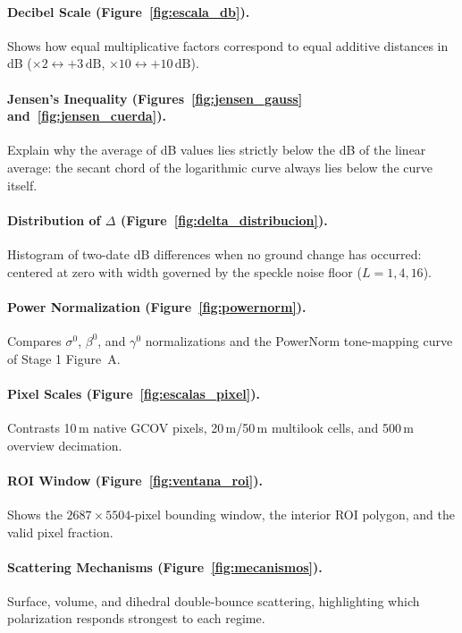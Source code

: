 \documentclass[11pt,a4paper]{article}
\begin{document}
\paragraph{Decibel Scale (Figure~\ref{fig:escala_db}).} Shows how equal multiplicative factors correspond to equal additive distances in dB ($\times 2 \leftrightarrow +3\,\text{dB}$, $\times 10 \leftrightarrow +10\,\text{dB}$).

\paragraph{Jensen's Inequality (Figures~\ref{fig:jensen_gauss} and~\ref{fig:jensen_cuerda}).} Explain why the average of dB values lies strictly below the dB of the linear average: the secant chord of the logarithmic curve always lies below the curve itself.

\paragraph{Distribution of $\Delta$ (Figure~\ref{fig:delta_distribucion}).} Histogram of two-date dB differences when no ground change has occurred: centered at zero with width governed by the speckle noise floor ($L=1,4,16$).

\paragraph{Power Normalization (Figure~\ref{fig:powernorm}).} Compares $\sigma^0$, $\beta^0$, and $\gamma^0$ normalizations and the PowerNorm tone-mapping curve of Stage 1 Figure~A.

\paragraph{Pixel Scales (Figure~\ref{fig:escalas_pixel}).} Contrasts 10\,m native GCOV pixels, 20\,m/50\,m multilook cells, and 500\,m overview decimation.

\paragraph{ROI Window (Figure~\ref{fig:ventana_roi}).} Shows the $2687\times5504$-pixel bounding window, the interior ROI polygon, and the valid pixel fraction.

\paragraph{Scattering Mechanisms (Figure~\ref{fig:mecanismos}).} Surface, volume, and dihedral double-bounce scattering, highlighting which polarization responds strongest to each regime.
\end{document}
